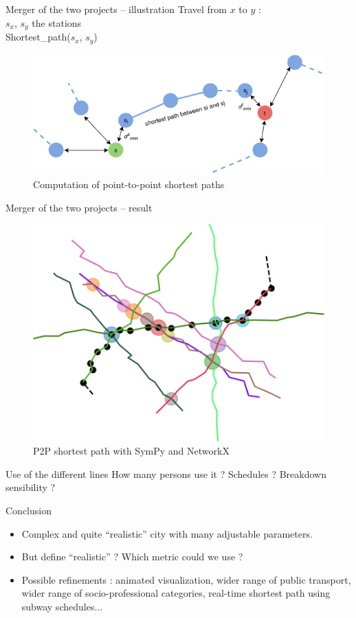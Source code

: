 \begin{frame}{Merger of the two projects -- illustration}
	Travel from $x$ to $y$ :\\
	$s_x$, $s_y$ the stations\\
	Shortest\_path($s_x$, $s_y$)
	\begin{figure}
		\centering
		\includegraphics[width=0.9\linewidth]{images/shortest_path.png}
		\caption{Computation of point-to-point shortest paths}
	\end{figure}
\end{frame}
\begin{frame}{Merger of the two projects -- result}
	\begin{figure}
		\centering
		\includegraphics[width=0.4\linewidth]{images/net_8.png}
		\caption{P2P shortest path with SymPy and NetworkX}
	\end{figure}
	\begin{alertblock}{Use of the different lines}
		How many persons use it ? Schedules ?
		Breakdown sensibility ?
	\end{alertblock}
\end{frame}
\begin{frame}{Conclusion}
	\begin{itemize}
		\item Complex and quite ``realistic'' city with many adjustable parameters.
		\item But define ``realistic'' ? Which metric could we use ?
		\item Possible refinements : animated visualization, wider range of public transport, wider range of socio-professional categories, real-time shortest path using subway schedules...
	\end{itemize}
	
\end{frame}